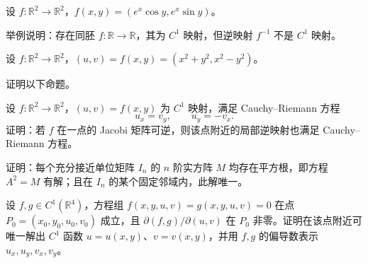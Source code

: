 \noindent\begin{minipage}{\textwidth}
设 $f:\mathbb R^2\to\mathbb R^2$，$f(x,y)=(e^x\cos y,e^x\sin y)$。
\end{minipage}\par\vfill
\noindent\begin{minipage}{\textwidth}
举例说明：存在同胚 $f:\mathbb R\to\mathbb R$，其为 $C^1$ 映射，但逆映射 $f^{-1}$ 不是 $C^1$ 映射。
\end{minipage}\par\vfill
\noindent\begin{minipage}{\textwidth}
设 $f:\mathbb R^2\to\mathbb R^2$，$(u,v)=f(x,y)=(x^2+y^2,x^2-y^2)$。
\end{minipage}\par\vfill
\newpage
\noindent\begin{minipage}{\textwidth}
证明以下命题。
\end{minipage}\par\vfill
\noindent\begin{minipage}{\textwidth}
设 $f:\mathbb R^2\to\mathbb R^2$，$(u,v)=f(x,y)$ 为 $C^1$ 映射，满足 Cauchy--Riemann 方程\[u_x=v_y,\qquad u_y=-v_x.\]证明：若 $f$ 在一点的 Jacobi 矩阵可逆，则该点附近的局部逆映射也满足 Cauchy--Riemann 方程。
\end{minipage}\par\vfill
\noindent\begin{minipage}{\textwidth}
证明：每个充分接近单位矩阵 $I_n$ 的 $n$ 阶实方阵 $M$ 均存在平方根，即方程 $A^2=M$ 有解；且在 $I_n$ 的某个固定邻域内，此解唯一。
\end{minipage}\par\vfill
\noindent\begin{minipage}{\textwidth}
设 $f,g\in C^1(\mathbb R^4)$，方程组 $f(x,y,u,v)=g(x,y,u,v)=0$ 在点 $P_0=(x_0,y_0,u_0,v_0)$ 成立，且 $\partial(f,g)/\partial(u,v)$ 在 $P_0$ 非零。证明在该点附近可唯一解出 $C^1$ 函数 $u=u(x,y)$、$v=v(x,y)$，并用 $f,g$ 的偏导数表示 $u_x,u_y,v_x,v_y$。
\end{minipage}\par\vfill
